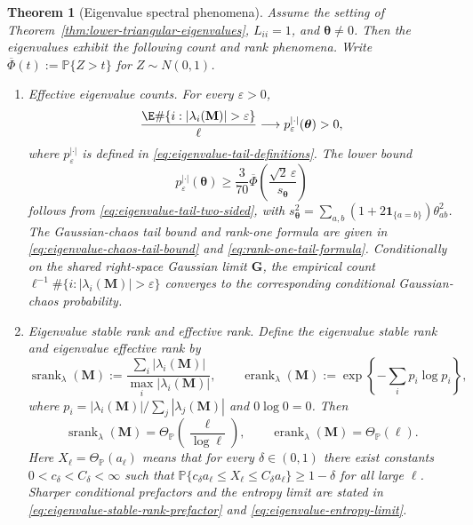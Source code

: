 \documentclass{article}
\newcommand{\Prob}{\mathbb{P}}
\newcommand{\srank}{\operatorname{srank}}
\newcommand{\erank}{\operatorname{erank}}
\newcommand{\bM}{\mathbf{M}}
\newcommand{\bG}{\mathbf{G}}
\newcommand{\barPhi}{\overline{\Phi}}
\newtheorem{theorem}{Theorem}
\theoremstyle{remark}
\begin{document}
\begin{theorem}[Eigenvalue spectral phenomena]
Assume the setting of Theorem~\ref{thm:lower-triangular-eigenvalues},
$L_{ii}=1$, and $\boldsymbol{\theta}\neq0$.  Then the eigenvalues exhibit the
following count and rank phenomena.  Write
$\barPhi(t):=\Prob\{Z>t\}$ for $Z\sim N(0,1)$.

\begin{enumerate}
\item[(i)] Effective eigenvalue counts.  For every $\varepsilon>0$,
\begin{equation}
    \frac{\E\#\{i:|\lambda_i(\bM)|>\varepsilon\}}{\ell}
    \longrightarrow
    p_\varepsilon^{|\cdot|}(\boldsymbol{\theta})>0,
    \label{eq:expected-effective-count}
\end{equation}
where $p_\varepsilon^{|\cdot|}$ is defined in
\eqref{eq:eigenvalue-tail-definitions}.  The lower bound
\begin{equation}
    p_\varepsilon^{|\cdot|}(\boldsymbol{\theta})
    \geq
    \frac{3}{70}
    \barPhi\left(
    \frac{\sqrt2\,\varepsilon}{s_{\boldsymbol{\theta}}}
    \right)
    \label{eq:noncollapsed-esd-mass}
\end{equation}
follows from \eqref{eq:eigenvalue-tail-two-sided}, with
$s_{\boldsymbol{\theta}}^2=\sum_{a,b}
(1+2\mathbf 1_{\{a=b\}})\theta_{ab}^2$.  The Gaussian-chaos tail bound and
rank-one formula are given in \eqref{eq:eigenvalue-chaos-tail-bound} and
\eqref{eq:rank-one-tail-formula}.
Conditionally on the shared right-space Gaussian limit $\bG$, the empirical count
$\ell^{-1}\#\{i:|\lambda_i(\bM)|>\varepsilon\}$ converges to the corresponding
conditional Gaussian-chaos probability.

\item[(ii)] Eigenvalue stable rank and effective rank.  Define the eigenvalue
stable rank and eigenvalue effective rank by
\[
    \srank_{\lambda}(\bM)
    :=
    \frac{\sum_i|\lambda_i(\bM)|}{\max_i|\lambda_i(\bM)|},
    \qquad
    \erank_{\lambda}(\bM)
    :=
    \exp\left\{-\sum_i p_i\log p_i\right\},
\]
where
$p_i=|\lambda_i(\bM)|/\sum_j|\lambda_j(\bM)|$ and $0\log0=0$.  Then
\begin{equation}
    \srank_{\lambda}(\bM)
    =
    \Theta_{\Prob}\left(\frac{\ell}{\log\ell}\right),
    \qquad
    \erank_{\lambda}(\bM)=\Theta_{\Prob}(\ell).
    \label{eq:eigenvalue-rank-summary}
\end{equation}
Here $X_\ell=\Theta_{\Prob}(a_\ell)$ means that for every $\delta\in(0,1)$
there exist constants $0<c_\delta<C_\delta<\infty$ such that
$\Prob\{c_\delta a_\ell\leq X_\ell\leq C_\delta a_\ell\}\geq1-\delta$ for all
large $\ell$.  Sharper conditional prefactors and the entropy limit are stated
in \eqref{eq:eigenvalue-stable-rank-prefactor} and
\eqref{eq:eigenvalue-entropy-limit}.
\end{enumerate}
\label{thm:eigenvalue-spectral-phenomena}
\end{theorem}
\end{document}

